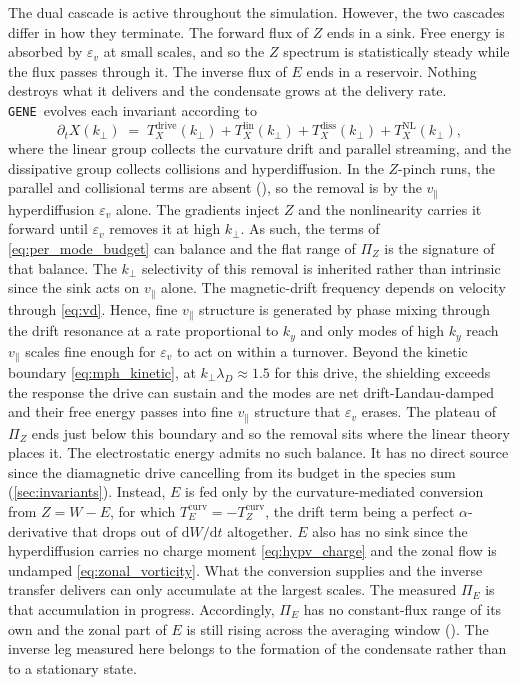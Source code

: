 \documentclass{jpp}
\newcommand{\rmd}{\text{d}}
\newcommand{\kperp}{k_\perp}
\newcommand{\vpar}{v_\parallel}
\newcommand{\lambdaD}{\lambda_D}
\newcommand{\gene}{\texttt{GENE}}
\begin{document}
The dual cascade is active throughout the simulation. However, the two cascades differ in how they terminate. The forward flux of $Z$ ends in a sink. Free energy is absorbed by $\varepsilon_v$ at small scales, and so the $Z$ spectrum is statistically steady while the flux passes through it. The inverse flux of $E$ ends in a reservoir. Nothing destroys what it delivers and the condensate grows at the delivery rate. \gene\ evolves each invariant according to
\begin{equation}\label{eq:per_mode_budget}
\partial_t X(\kperp) \;=\; T_X^\mathrm{drive}(\kperp) + T_X^\mathrm{lin}(\kperp) + T_X^\mathrm{diss}(\kperp) + T_X^\mathrm{NL}(\kperp),
\end{equation}
where the linear group collects the curvature drift and parallel streaming, and the dissipative group collects collisions and hyperdiffusion. In the $Z$-pinch runs, the parallel and collisional terms are absent (), so the removal is by the $\vpar$ hyperdiffusion $\varepsilon_v$ alone. The gradients inject $Z$ and the nonlinearity carries it forward until $\varepsilon_v$ removes it at high $\kperp$. As such, the terms of \cref{eq:per_mode_budget} can balance and the flat range of $\Pi_Z$ is the signature of that balance. The $\kperp$ selectivity of this removal is inherited rather than intrinsic since the sink acts on $\vpar$ alone. The magnetic-drift frequency depends on velocity through \cref{eq:vd}. Hence, fine $\vpar$ structure is generated by phase mixing through the drift resonance at a rate proportional to $k_y$ and only modes of high $k_y$ reach $\vpar$ scales fine enough for $\varepsilon_v$ to act on within a turnover. Beyond the kinetic boundary \cref{eq:mph_kinetic}, at $\kperp\lambdaD \approx 1.5$ for this drive, the shielding exceeds the response the drive can sustain and the modes are net drift-Landau-damped \citep{MPH2018} and their free energy passes into fine $\vpar$ structure that $\varepsilon_v$ erases. The plateau of $\Pi_Z$ ends just below this boundary and so the removal sits where the linear theory places it. The electrostatic energy admits no such balance. It has no direct source since the diamagnetic drive cancelling from its budget in the species sum (\cref{sec:invariants}). Instead, $E$ is fed only by the curvature-mediated conversion from $Z = W - E$, for which $T_E^\mathrm{curv} = -T_Z^\mathrm{curv}$, the drift term being a perfect $\alpha$-derivative that drops out of $\rmd W/\rmd t$ altogether. $E$ also has no sink since the hyperdiffusion carries no charge moment \cref{eq:hypv_charge} and the zonal flow is undamped \cref{eq:zonal_vorticity}. What the conversion supplies and the inverse transfer delivers can only accumulate at the largest scales. The measured $\Pi_E$ is that accumulation in progress. Accordingly, $\Pi_E$ has no constant-flux range of its own and the zonal part of $E$ is still rising across the averaging window (). The inverse leg measured here belongs to the formation of the condensate rather than to a stationary state.
\end{document}
